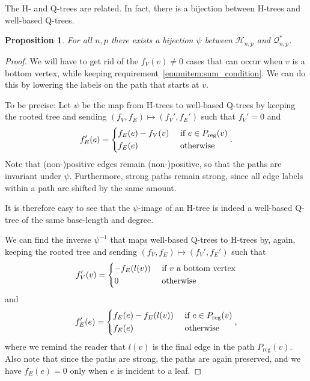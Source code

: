 \documentclass[11pt]{article}
\theoremstyle{plain}
\newtheorem{proposition}[theorem]{Proposition}
\theoremstyle{definition}
\begin{document}
The H- and Q-trees are related. In fact, there is a bijection between H-trees and well-based Q-trees. 

\begin{proposition}\label{prop:H_Q*_bij}
    For all $n,p$ there exists a bijection $\psi$ between $\mathcal{H}_{n,p}$ and $\mathcal{Q}^*_{n,p}$.
\end{proposition}

\begin{proof} 
    We will have to get rid of the $f_V(v)\neq0$ cases that can occur when $v$ is a bottom vertex, while keeping requirement~\ref{enumitem:sum_condition}. 
    We can do this by lowering the labels on the path that starts at $v$.  

    To be precise: 
    Let $\psi$ be the map from H-trees to well-based Q-trees by keeping the rooted tree and sending $(f_V,f_E)\mapsto (f_V',f_E')$ such that $f_V'=0$ and
    \begin{align}
        f_E'(e)=\begin{dcases}
            f_E(e) - f_V(v) &\textrm{ if } e\in P_\textrm{reg}(v)\\
            f_E(e)          &\textrm{ otherwise}
        \end{dcases}.
    \end{align}
    Note that (non-)positive edges remain (non-)positive, so that the paths are invariant under $\psi$. 
    Furthermore, strong paths remain strong, since all edge labels within a path are shifted by the same amount.
    
    It is therefore easy to see that the $\psi$-image of an H-tree is indeed a well-based Q-tree of the same base-length and degree.

    We can find the inverse $\psi^{-1}$ that maps well-based Q-trees to H-trees by, again, keeping the rooted tree and sending $(f_V,f_E)\mapsto (f_V',f_E')$ such that 
    \begin{align}
        f_V'(v)=\begin{dcases}
            -f_E(l(v)) & \textrm{ if $v$ a bottom vertex}\\  
            0 & \textrm{ otherwise}
        \end{dcases}
    \end{align}
    and
    \begin{align}
        f_E'(e)=\begin{dcases}
            f_E(e) - f_E(l(v)) &\textrm{ if } e\in P_\textrm{reg}(v)\\
            f_E(e)          &\textrm{ otherwise}
        \end{dcases},
    \end{align}
    where we remind the reader that $l(v)$ is the final edge in the path $P_\textrm{reg}(v)$.
    Also note that since the paths are strong, the paths are again preserved, and we have $f_E(e)=0$ only when $e$ is incident to a leaf.
\end{proof}
\end{document}
